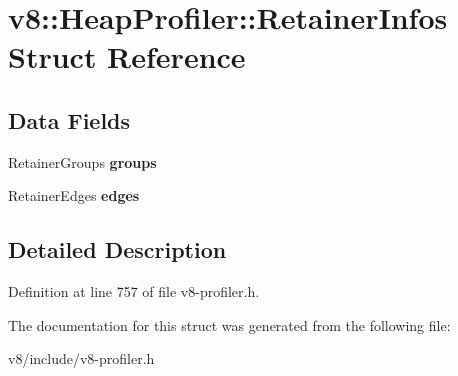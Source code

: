 \hypertarget{structv8_1_1HeapProfiler_1_1RetainerInfos}{}\section{v8\+:\+:Heap\+Profiler\+:\+:Retainer\+Infos Struct Reference}
\label{structv8_1_1HeapProfiler_1_1RetainerInfos}
\subsection*{Data Fields}
\begin{DoxyCompactItemize}
\item 
\mbox{\label{structv8_1_1HeapProfiler_1_1RetainerInfos_ac955e4c7a262b0d374e70d6229d5b672}} 
Retainer\+Groups {\bfseries groups}
\item 
\mbox{\label{structv8_1_1HeapProfiler_1_1RetainerInfos_a30a98dbe97c3b3462f1737e15debaedc}} 
Retainer\+Edges {\bfseries edges}
\end{DoxyCompactItemize}


\subsection{Detailed Description}


Definition at line 757 of file v8-\/profiler.\+h.



The documentation for this struct was generated from the following file\+:\begin{DoxyCompactItemize}
\item 
v8/include/v8-\/profiler.\+h\end{DoxyCompactItemize}
